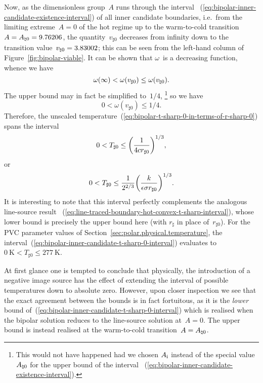 Now, as the dimensionless group~$A$
runs through the interval~%
  (\ref{eq:bipolar-inner-candidate-existence-interval})
of all inner candidate boundaries,
i.e.~from the limiting extreme~$A = 0$ of the hot regime
up to the warm-to-cold transition~$A = A_{\natural 0} = 9.76206$,
the quantity~$v_{\sharp 0}$ decreases from infinity
down to the transition value~$v_{\natural 0} = 3.83002$;
this can be seen from the left-hand column
of Figure~\ref{fig:bipolar-viable}.
It can be shown that $\omega$~is a decreasing function,
whence we have
\begin{equation}
  \omega (\infty) < \omega (v_{\sharp 0}) \le \omega (v_{\natural 0}).
  \label{eq:bipolar-inner-candidate-omega-interval}
\end{equation}
The upper bound may in fact be simplified to~$1/4$,%
\footnote{
  This would not have happened
  had we chosen $A_{\mathrm{i}}$ instead of the special value~$A_{\natural 0}$
  for the upper bound of the interval~%
  (\ref{eq:bipolar-inner-candidate-existence-interval}).
}
so we have
\begin{equation}
  0 < \omega (v_{\sharp 0}) \le 1/4.
  \label{eq:bipolar-inner-candidate-omega-interval-evaluated}
\end{equation}
Therefore,
the unscaled temperature~(\ref{eq:bipolar-t-sharp-0-in-terms-of-r-sharp-0})
spans the interval
\[
  0
    <
  T_{\sharp 0}
    \le
  \roundbr*{\frac{1}{4 c r_{\sharp 0}}}^{1/3},
\]
or
\begin{equation}
  0
    <
  T_{\sharp 0}
    \le
  \frac{1}{2^{2/3}}
  \roundbr*{\frac{\conduc}{\emiss \stefan r_{\sharp 0}}}^{1/3}.
  \label{eq:bipolar-inner-candidate-t-sharp-0-interval}
\end{equation}
It is interesting to note that this interval
perfectly complements the analogous line-source result~%
  (\ref{eq:line-traced-boundary-hot-convex-t-sharp-interval}),
whose lower bound is precisely the upper bound here
(with $r_\sharp$ in place of~$r_{\sharp 0}$).
For the PVC parameter values
of Section~\ref{sec:polar.physical.temperature},
the interval~(\ref{eq:bipolar-inner-candidate-t-sharp-0-interval})
evaluates to $\SI{0}{\kelvin} < T_{\sharp 0} \le \SI{277}{\kelvin}$.

At first glance one is tempted to conclude that physically,
the introduction of a negative image source
has the effect of extending the interval of possible temperatures
down to absolute zero.
However, upon closer inspection we see that
the exact agreement between the bounds is in fact fortuitous,
as it is the \emph{lower} bound
of~(\ref{eq:bipolar-inner-candidate-t-sharp-0-interval})
which is realised
when the bipolar solution reduces to the line-source solution
at~$A = 0$.
The upper bound is instead realised at
the warm-to-cold transition~$A = A_{\natural 0}$.

